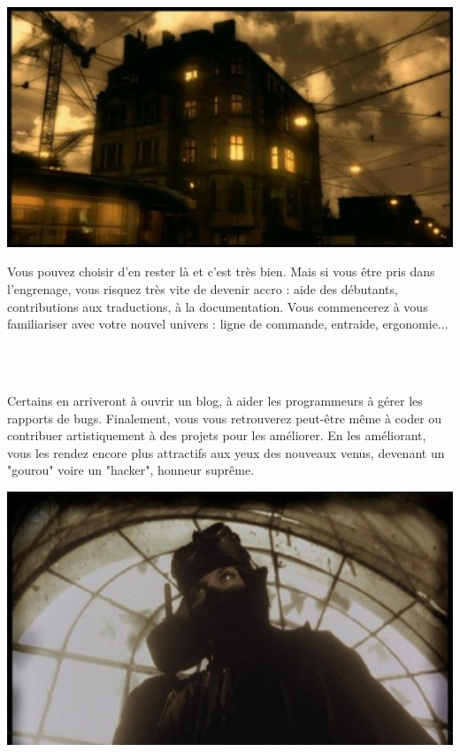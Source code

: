 \documentclass[11pt,twoside,a4paper]{article}
\begin{document}
\begin{minipage}[ht]{14.10cm}
	\includegraphics[width=14.05cm]{img/avalon10.jpg}
\end{minipage} \hfill \begin{minipage}[ht]{0.30\textwidth}
	Vous pouvez choisir d'en rester l{\`a} et c'est tr{\`e}s bien. Mais si vous {\^e}tre pris dans l'engrenage, vous risquez tr{\`e}s vite de devenir accro : aide des d{\'e}butants, contributions aux traductions, {\`a} la documentation. Vous commencerez {\`a} vous familiariser avec votre nouvel univers : ligne de commande, entraide, ergonomie... ~\\
\end{minipage}~\\

\vfill
\clearpage
\vfill

\begin{minipage}[ht]{0.30\textwidth}
	Certains en arriveront {\`a} ouvrir un blog, {\`a} aider les programmeurs {\`a} g{\'e}rer les rapports de bugs. Finalement, vous vous retrouverez peut-{\^e}tre m{\^e}me {\`a} coder ou contribuer artistiquement {\`a} des projets pour les am{\'e}liorer. En les am{\'e}liorant, vous les rendez encore plus attractifs aux yeux des nouveaux venus, devenant un "gourou" voire un "hacker", honneur supr{\^e}me.
\end{minipage} \hfill \begin{minipage}[ht]{14.10cm}
	\includegraphics[width=14.05cm]{img/avalon_window.jpg}
\end{minipage}~\\~\\~\\
\end{document}
